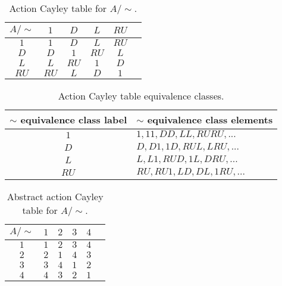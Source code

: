 \begin{table}
    \centering
    \begin{tabular}{c|c c c c c}
        $A/\sim$    &  $1$      & $D$       & $L$       & $RU$\\
        \hline
        $1$         & $1$       & $D$       & $L$       & $RU$\\
        $D$         & $D$       & $1$       & $RU$      & $L$\\
        $L$         & $L$       & $RU$      & $1$       & $D$\\
        $RU$        & $RU$      & $L$       & $D$       & $1$\\
    \end{tabular}
    \caption{Action Cayley table for $A/\sim$.}
    \label{tab:2x2-gridworld-no-walls-action-cayley}
\end{table}

\begin{table}[H]
    \centering
    \begin{tabular}{c|l}
        $\sim$ equivalence class label & $\sim$ equivalence class elements\\
        \hline
        $1$         & $1, 11, DD, LL, RURU, ...$\\
        $D$         & $D, D1, 1D, RUL, LRU, ...$\\
        $L$         & $L, L1, RUD, 1L, DRU, ...$\\
        $RU$        & $RU, RU1, LD, DL, 1RU, ...$
    \end{tabular}
    \caption{Action Cayley table equivalence classes.}
    \label{tab:2x2-gridworld-no-walls-equivalence-classes}
\end{table}

\begin{table}[H]
    \centering
    \begin{tabular}{c|c c c c c}
        $A/\sim$    &  $1$      & $2$       & $3$       & $4$\\
        \hline
        $1$         & $1$       & $2$       & $3$       & $4$\\
        $2$         & $2$       & $1$       & $4$      & $3$\\
        $3$         & $3$       & $4$      & $1$       & $2$\\
        $4$        & $4$      & $3$       & $2$       & $1$\\
    \end{tabular}
    \caption{Abstract action Cayley table for $A/\sim$.}
    \label{tab:2x2-gridworld-no-walls-action-cayley-abstract}
\end{table}

